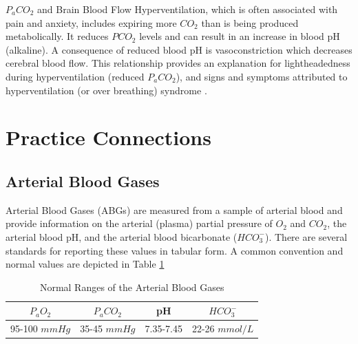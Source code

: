 \begin{warning}{$P_aCO_2$ and Brain Blood Flow}
    Hyperventilation, which is often associated with pain and anxiety, includes expiring more $CO_2$ than is being produced metabolically. It reduces $PCO_2$ levels and can result in an increase in blood pH (alkaline). A consequence of reduced blood pH is vasoconstriction which decreases cerebral blood flow. This relationship provides an explanation for lightheadedness during hyperventilation (reduced $P_aCO_2$), and signs and symptoms attributed to hyperventilation (or over breathing) syndrome \cite{courtney_investigating_2008}.
\end{warning}

\section{Practice Connections}

\subsection{Arterial Blood Gases}

Arterial Blood Gases (ABGs) are measured from a sample of arterial blood and provide information on the arterial (plasma) partial pressure of $O_2$ and $CO_2$, the arterial blood pH, and the arterial blood bicarbonate ($HCO_3^-$). There are several standards for reporting these values in tabular form. A common convention and normal values are depicted in Table \ref{table:ABGs}

\begin{table}[h!]
\centering
\begin{tabular}{||c|c|c|c||} 
 \hline
 $P_aO_2$ & $P_aCO_2$ & pH & $HCO_3^-$ \\ [0.5ex] 
 \hline
 95-100 $mmHg$ & 35-45 $mmHg$ & 7.35-7.45 & 22-26 $mmol/L$ \\ [1ex] 
 \hline
\end{tabular}
\caption{Normal Ranges of the Arterial Blood Gases}
\label{table:ABGs}
\end{table}

